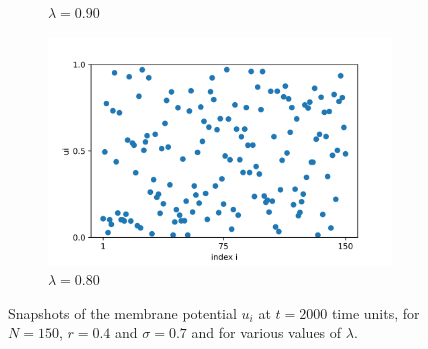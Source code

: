 \documentclass[a4paper,12pt]{article}
\begin{document}
\begin{figure}[H]
\begin{subfigure}{.32\textwidth}
  \caption{$\lambda=0.90$}
\end{subfigure}
\hfill
\begin{subfigure}{.32\textwidth}
  \centering
  \includegraphics[width=1\linewidth]{u_lambda=0.8_t=2000.png}  
  \caption{$\lambda=0.80$}
\end{subfigure}

\caption{Snapshots of the membrane potential $u_i$ at $t=2000$ time units, for $N=150$, $r=0.4$ and $\sigma = 0.7$ and for various values of $\lambda$.}
\label{uivslmd}
\end{figure}
\end{document}
